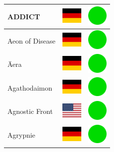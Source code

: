 \documentclass[12pt, a4paper, twoside]{report}
\begin{document}
\begin{center}
\begin{longtable}{|p{5cm}|p{2cm}|p{2cm}|}
ADDICT & \includegraphics[width=1cm]{4x3/de} & \includegraphics[width=1cm]{likes/y} \\ \hline
Aeon of Disease & \includegraphics[width=1cm]{4x3/de} & \includegraphics[width=1cm]{likes/y} \\ \hline
Äera & \includegraphics[width=1cm]{4x3/de} & \includegraphics[width=1cm]{likes/y} \\ \hline
Agathodaimon & \includegraphics[width=1cm]{4x3/de} & \includegraphics[width=1cm]{likes/y} \\ \hline
Agnostic Front & \includegraphics[width=1cm]{4x3/us} & \includegraphics[width=1cm]{likes/y} \\ \hline
Agrypnie & \includegraphics[width=1cm]{4x3/de} & \includegraphics[width=1cm]{likes/y} \\ \hline

\end{longtable}
\end{center}
\end{document}
